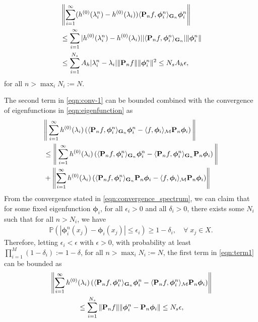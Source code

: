 \begin{align}
   &\nonumber \left\| \sum_{i=1}^\infty ({h}^{(0)}(\lambda_i^n) - {h}^{(0)}(\lambda_i)) \langle {\ensuremath{\mathbf P}}_n f,\bm\phi_i^n \rangle_{{\mathbf G}_n} \bm\phi_i^n  \right\|\\
   & \leq \sum_{i=1}^\infty |{h}^{(0)}(\lambda_i^n)-{h}^{(0)}(\lambda_i)| |\langle {\ensuremath{\mathbf P}}_n f,\bm\phi_i^n \rangle_{{\mathbf G}_n}| \|\bm\phi_i^n\|\\
   &\leq \sum_{i=1}^{N_s} A_h |\lambda_i^n-\lambda_i| \|{\mathbf P}_n f\| \|\bm\phi_i^n \|^2\leq N_s A_h\epsilon,
\end{align} 
for all $n>\max_i N_i := N$.

The second term in \eqref{eqn:conv-1} can be bounded combined with the convergence of eigenfunctions in \eqref{eqn:eigenfunction} as
\begin{align}
  & \nonumber \Bigg\| \sum_{i=1}^\infty {h}^{(0)}(\lambda_i)\left( \langle {\ensuremath{\mathbf P}}_nf,\bm\phi_i^n \rangle_{{\mathbf G}_n}\bm\phi_i^n - \langle f,\bm\phi_i \rangle_{{\mathcal M}} {\mathbf P}_n \bm\phi_i\right)  \Bigg\|\\
   & \leq \nonumber \Bigg\|  \sum_{i=1}^\infty {h}^{(0)}(\lambda_i)  \left(\langle {\ensuremath{\mathbf P}}_n f,\bm\phi_i^n\rangle_{{\mathbf G}_n}\bm\phi_i^n  - \langle {\ensuremath{\mathbf P}}_nf,\bm\phi_i^n \rangle_{{\mathbf G}_n} {\mathbf P}_n\bm\phi_i\right)\Bigg\|\\
   &\label{eqn:term1}+ \left\| \sum_{i=1}^\infty  {h}^{(0)}(\lambda_i) \left(\langle {\ensuremath{\mathbf P}}_n f,\bm\phi_i^n\rangle_{{\mathbf G}_n} {\mathbf P}_n\bm\phi_i -\langle f,\bm\phi_i\rangle_{\mathcal M} {\mathbf P}_n\bm\phi_i \right) \right\|
\end{align}
From the convergence stated in \eqref{eqn:convergence_spectrum}, we can claim that for some fixed eigenfunction $\bm\phi_i$,  for all $\epsilon_i>0$ and all $\delta_i>0$, there exists some $N_i$ such that for all $n>N_i$, we have
\begin{gather}
 \label{eqn:eigenfunction}    \mathbb{P}(|\bm\phi_i^n(x_j) - \bm\phi_i(x_j)|\leq \epsilon_i)\geq 1-\delta_i,\quad \forall \; x_j\in X .
 \end{gather}
 Therefore, letting $\epsilon_i < \epsilon$ with $\epsilon > 0$, with probability at least $\prod_{i=1}^M(1-\delta_i) := 1-\delta$, for all $n> \max_i N_i := N$, the first term in \eqref{eqn:term1} can be bounded as
\begin{align}
& \nonumber \left\|  \sum_{i=1}^\infty {h}^{(0)}(\lambda_i) \left(\langle {\ensuremath{\mathbf P}}_n f,\bm\phi_i^n\rangle_{{\mathbf G}_n}\bm\phi_i^n  - \langle {\ensuremath{\mathbf P}}_nf,\bm\phi_i^n \rangle_{{\mathcal M}} {\mathbf P}_n\bm\phi_i\right)\right\|\\
& \qquad \qquad\leq \sum_{i=1}^{N_s} \|{\mathbf P}_n f\|\|\bm\phi_i^n - {\mathbf P}_n\bm\phi_i\|\leq N_s \epsilon,
\end{align}
